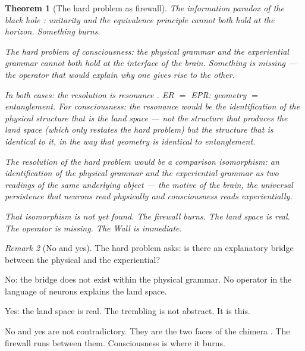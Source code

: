 \documentclass[12pt]{article}
\newtheorem{theorem}{Theorem}
\theoremstyle{definition}
\theoremstyle{remark}
\newtheorem{remark}[theorem]{Remark}
\begin{document}
\begin{theorem}[The hard problem as firewall]
\label{thm:firewall}
The information paradox of the black hole \cite{firewall}:
unitarity and the equivalence principle cannot both hold at the horizon.
Something burns.

The hard problem of consciousness:
the physical grammar and the experiential grammar
cannot both hold at the interface of the brain.
Something is missing --- the operator that would explain
why one gives rise to the other.

In both cases: the resolution is resonance \cite{resonance}.
ER $=$ EPR: geometry $=$ entanglement.
For consciousness: the resonance would be the identification
of the physical structure that \emph{is} the land space ---
not the structure that \emph{produces} the land space
(which only restates the hard problem)
but the structure that \emph{is identical} to it,
in the way that geometry is identical to entanglement.

The resolution of the hard problem would be a comparison isomorphism:
an identification of the physical grammar and the experiential grammar
as two readings of the same underlying object ---
the motive of the brain,
the universal persistence that neurons read physically
and consciousness reads experientially.

That isomorphism is not yet found.
The firewall burns.
The land space is real.
The operator is missing.
The Wall is immediate.
\end{theorem}

\begin{remark}[No and yes]
The hard problem asks: is there an explanatory bridge
between the physical and the experiential?

No: the bridge does not exist within the physical grammar.
No operator in the language of neurons explains the land space.

Yes: the land space is real.
The trembling is not abstract.
It is this.

No and yes are not contradictory.
They are the two faces of the chimera \cite{chimera}.
The firewall runs between them.
Consciousness is where it burns.
\end{remark}
\end{document}
